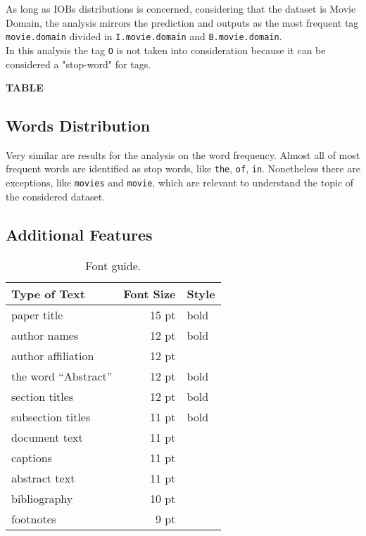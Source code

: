 \documentclass[11pt,a4paper]{article}
\begin{document}
As long as IOBs distributions is concerned, considering that the dataset is Movie Domain, the analysis mirrors the prediction and outputs as the most frequent tag {\tt movie.domain} divided in {\tt I.movie.domain} and {\tt B.movie.domain}.\\

In this analysis the tag {\tt O} is not taken into consideration because it can be considered a "stop-word" for tags.
 
\large\textbf{TABLE}

\subsection{Words Distribution}

Very similar are results for the analysis on the word frequency. Almost all of most frequent words are identified as stop words, like {\tt the}, {\tt of}, {\tt in}. Nonetheless there are exceptions, like {\tt movies} and {\tt movie}, which are relevant to understand the topic of the considered dataset.


\subsection{Additional Features}
\label{subsect:addfeat}



\begin{table}[t!]
\begin{center}
\begin{tabular}{|l|rl|}
\hline \bf Type of Text & \bf Font Size & \bf Style \\ \hline
paper title & 15 pt & bold \\
author names & 12 pt & bold \\
author affiliation & 12 pt & \\
the word ``Abstract'' & 12 pt & bold \\
section titles & 12 pt & bold \\
subsection titles & 11 pt & bold \\
document text & 11 pt  &\\
captions & 11 pt & \\
abstract text & 11 pt & \\
bibliography & 10 pt & \\
footnotes & 9 pt & \\
\hline
\end{tabular}
\end{center}
\caption{\label{font-table} Font guide. }
\end{table}
\end{document}

